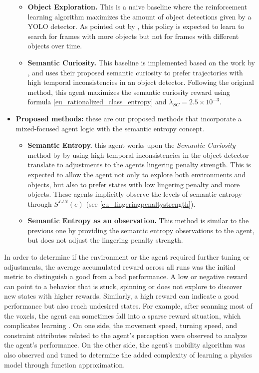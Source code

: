 \begin{itemize}
\begin{itemize}
        \item \textbf{Object Exploration.} This is a naive baseline where the reinforcement learning algorithm maximizes the amount of object detections given by a YOLO detector. As pointed out by \textcite{chaplot2020semantic}, this policy is expected to learn to search for frames with more objects but not for frames with different objects over time.
        \item \textbf{Semantic Curiosity.} This baseline is implemented based on the work by \textcite{chaplot2020semantic}, and uses their proposed semantic curiosity to prefer trajectories with high temporal inconsistencies in an object detector. Following the original method, this agent maximizes the semantic curiosity reward using formula \ref{eu_rationalized_class_entropy} and $\lambda_{S C}=2.5 \times 10^{-3}$.
    \end{itemize}
    \item \textbf{Proposed methods:} these are our proposed methods that incorporate a mixed-focused agent logic with the semantic entropy concept.
        \begin{itemize}
            \item \textbf{Semantic Entropy.} this agent works upon the \textit{Semantic Curiosity} method by \textcite{chaplot2020semantic} by using high temporal inconsistencies in the object detector translate to adjustments to the agents lingering penalty strength. This is expected to allow the agent not only to explore both environments and objects, but also to prefer states with low lingering penalty and more objects. These agents implicitly observe the levels of semantic entropy through $S^{LIN}(e)$ (see \ref{eu_lingeringpenaltystrength}).
            \item \textbf{Semantic Entropy as an observation.} This method is similar to the previous one by providing the semantic entropy observations to the agent, but does not adjust the lingering penalty strength.
        \end{itemize}
\end{itemize}


In order to determine if the environment or the agent required further tuning or adjustments, the average accumulated reward across all runs was the initial metric to distinguish a good from a bad performance. A low or negative reward can point to a behavior that is stuck, spinning or does not explore to discover new states with higher rewards. Similarly, a high reward can indicate a good performance but also reach undesired states. For example, after scanning most of the voxels, the agent can sometimes fall into a sparse reward situation, which complicates learning \cite{sutton2018reinforcement}.
On one side, the movement speed, turning speed, and constraint attributes related to the agent's perception were observed to analyze the agent's performance. On the other side, the agent's mobility algorithm was also observed and tuned to determine the added complexity of learning a physics model through function approximation.

